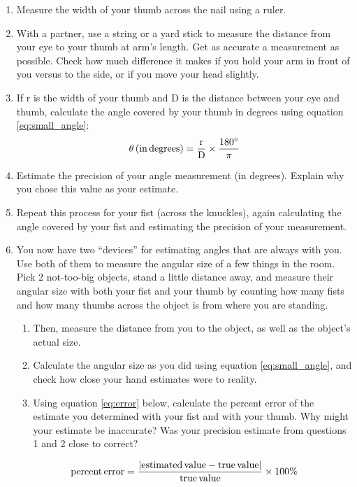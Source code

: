 \documentclass[11pt]{article}
\begin{document}
\begin{enumerate}
    \item Measure the width of your thumb across the nail using a ruler. 
    
    \item With a partner, use a string or a yard stick to measure the distance from your eye to your thumb at arm's length. Get as accurate a measurement as possible. Check how much difference it makes if you hold your arm in front of you versus to the side, or if you move your head slightly. 
    
    \item If r is the width of your thumb and D is the distance between your eye and thumb, calculate the angle covered by your thumb in degrees using equation \ref{eq:small_angle}: 
    \begin{equation} \label{eq:small_angle}
        \theta \, \rm{(in \, degrees)} = \frac{r}{D} \times \frac{180^\circ}{\pi}
    \end{equation}
    
    \item Estimate the precision of your angle measurement (in degrees). Explain why you chose this value as your estimate.
    
    \item Repeat this process for your fist (across the knuckles), again calculating the angle covered by your fist and estimating the precision of your measurement.
    
    \item You now have two ``devices'' for estimating angles that are always with you. Use both of them to measure the angular size of a few things in the room.  Pick 2 not-too-big objects, stand a little distance away, and measure their angular size with both your fist and your thumb by counting how many fists and how many thumbs across the object is from where you are standing.
    \begin{enumerate}
        \item Then, measure the distance from you to the object, as well as the object's actual size.
        
        \item Calculate the angular size as you did using equation \ref{eq:small_angle}, and check how close your hand estimates were to reality.
        
        \item Using equation \ref{eq:error} below, calculate the percent error of the estimate you determined with your fist and with your thumb. Why might your estimate be inaccurate? Was your precision estimate from questions 1 and 2 close to correct?
    \end{enumerate}
    
    \begin{equation} \label{eq:error}
        \rm{percent \, error} = \frac{\rm{\left|estimated \, value - true \, value \right|}}{true \, value} \times 100\%
    \end{equation}
\end{enumerate}
\end{document}
